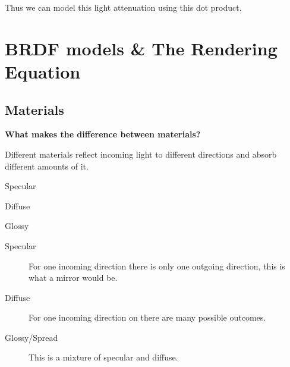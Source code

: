 \documentclass[10pt]{armath}
\numberwithin{equation}{section}
\newenvironment{Figure}
{\par\medskip\noindent\minipage{\linewidth}}
{\endminipage\par\medskip}
\theoremstyle{definition}
\begin{document}
\begin{multicols}{2}
  Thus we can model this light attenuation using this dot product.

  \section{BRDF models \& The Rendering Equation}%
  \label{sec:brdf_models_&_the_rendering_equation}

  \subsection{Materials}%
  \label{sub:materials}

  \textbf{What makes the difference between materials?}

  Different materials reflect incoming light to different directions and absorb
  different amounts of it.

  \begin{Figure}
    \begin{center}
      \centering
      \begin{minipage}{0.3\textwidth}
        \begin{center}
          
          Specular
        \end{center}
      \end{minipage}
      \begin{minipage}{0.3\textwidth}
        \begin{center}
          
          Diffuse
        \end{center}
      \end{minipage}
      \begin{minipage}{0.3\textwidth}
        \begin{center}
          
          Glossy
        \end{center}
      \end{minipage}
    \end{center}
    \label{fig:03_1}
  \end{Figure}


  \begin{description}
    \item[Specular] For one incoming direction there is only one outgoing
      direction, this is what a mirror would be.
    \item[Diffuse] For one incoming direction on there are many possible
      outcomes.
    \item[Glossy/Spread] This is a mixture of specular and diffuse.
  \end{description}


\end{multicols}
\end{document}
